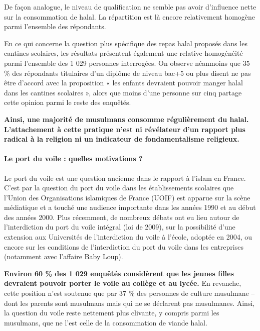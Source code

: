 De façon analogue, le niveau de qualification ne semble pas avoir
d'influence nette sur la consommation de halal. La répartition est là
encore relativement homogène parmi l'ensemble des répondants.



En ce qui concerne la question plus spécifique des repas halal proposés
dans les cantines scolaires, les résultats présentent également une
relative homogénéité parmi l'ensemble des 1 029 personnes interrogées.
On observe néanmoins que 35 \% des répondants titulaires d'un diplôme de
niveau bac+5 ou plus disent ne pas être d'accord avec la proposition «
les enfants devraient pouvoir manger halal dans les cantines scolaires
», alors que moins d'une personne sur cinq partage cette opinion parmi
le reste des enquêtés.


\textbf{Ainsi, une majorité de musulmans consomme régulièrement du
halal. L'attachement à cette pratique n'est ni révélateur d'un rapport
plus radical à la religion ni un indicateur de fondamentalisme
religieux.}



\paragraph{Le port du voile : quelles motivations
?}


Le port du voile est une question ancienne dans le rapport à l'islam en
France. C'est par la question du port du voile dans les établissements
scolaires que l'Union des Organisations islamiques de France (UOIF) est
apparue sur la scène médiatique et a touché une audience importante dans
les années 1990 et au début des années 2000. Plus récemment, de nombreux
débats ont eu lieu autour de l'interdiction du port du voile intégral
(loi de 2009), sur la possibilité d'une extension aux Universités de
l'interdiction du voile à l'école, adoptée en 2004, ou encore sur les
conditions de l'interdiction du port du voile dans les entreprises
(notamment avec l'affaire Baby Loup).


\textbf{Environ 60 \% des 1 029 enquêtés considèrent que les jeunes
filles devraient pouvoir porter le voile au collège et au lycée.} En
revanche, cette position n'est soutenue que par 37 \% des personnes de
culture musulmane -- dont les parents sont musulmans mais qui ne se
déclarent pas musulmanes. Ainsi, la question du voile reste nettement
plus clivante, y compris parmi les musulmans, que ne l'est celle de la
consommation de viande halal.

